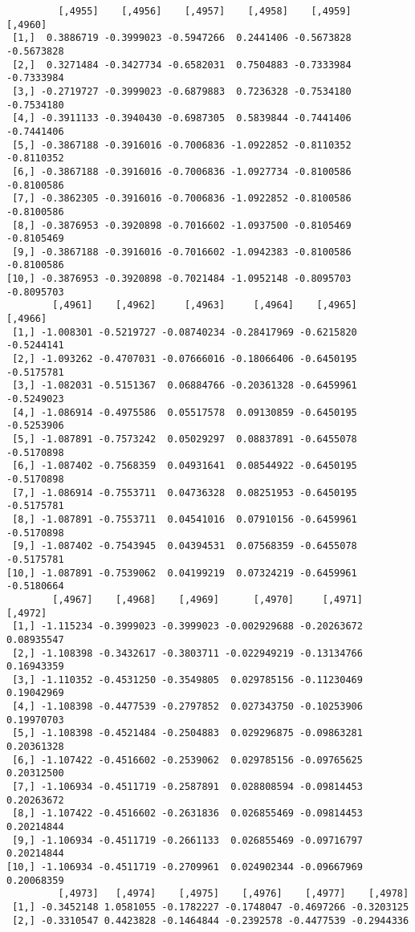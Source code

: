 \documentclass[
  letterpaper,
  DIV=11,
  numbers=noendperiod]{scrreprt}
\begin{document}
\begin{verbatim}
         [,4955]    [,4956]    [,4957]    [,4958]    [,4959]    [,4960]
 [1,]  0.3886719 -0.3999023 -0.5947266  0.2441406 -0.5673828 -0.5673828
 [2,]  0.3271484 -0.3427734 -0.6582031  0.7504883 -0.7333984 -0.7333984
 [3,] -0.2719727 -0.3999023 -0.6879883  0.7236328 -0.7534180 -0.7534180
 [4,] -0.3911133 -0.3940430 -0.6987305  0.5839844 -0.7441406 -0.7441406
 [5,] -0.3867188 -0.3916016 -0.7006836 -1.0922852 -0.8110352 -0.8110352
 [6,] -0.3867188 -0.3916016 -0.7006836 -1.0927734 -0.8100586 -0.8100586
 [7,] -0.3862305 -0.3916016 -0.7006836 -1.0922852 -0.8100586 -0.8100586
 [8,] -0.3876953 -0.3920898 -0.7016602 -1.0937500 -0.8105469 -0.8105469
 [9,] -0.3867188 -0.3916016 -0.7016602 -1.0942383 -0.8100586 -0.8100586
[10,] -0.3876953 -0.3920898 -0.7021484 -1.0952148 -0.8095703 -0.8095703
        [,4961]    [,4962]     [,4963]     [,4964]    [,4965]    [,4966]
 [1,] -1.008301 -0.5219727 -0.08740234 -0.28417969 -0.6215820 -0.5244141
 [2,] -1.093262 -0.4707031 -0.07666016 -0.18066406 -0.6450195 -0.5175781
 [3,] -1.082031 -0.5151367  0.06884766 -0.20361328 -0.6459961 -0.5249023
 [4,] -1.086914 -0.4975586  0.05517578  0.09130859 -0.6450195 -0.5253906
 [5,] -1.087891 -0.7573242  0.05029297  0.08837891 -0.6455078 -0.5170898
 [6,] -1.087402 -0.7568359  0.04931641  0.08544922 -0.6450195 -0.5170898
 [7,] -1.086914 -0.7553711  0.04736328  0.08251953 -0.6450195 -0.5175781
 [8,] -1.087891 -0.7553711  0.04541016  0.07910156 -0.6459961 -0.5170898
 [9,] -1.087402 -0.7543945  0.04394531  0.07568359 -0.6455078 -0.5175781
[10,] -1.087891 -0.7539062  0.04199219  0.07324219 -0.6459961 -0.5180664
        [,4967]    [,4968]    [,4969]      [,4970]     [,4971]    [,4972]
 [1,] -1.115234 -0.3999023 -0.3999023 -0.002929688 -0.20263672 0.08935547
 [2,] -1.108398 -0.3432617 -0.3803711 -0.022949219 -0.13134766 0.16943359
 [3,] -1.110352 -0.4531250 -0.3549805  0.029785156 -0.11230469 0.19042969
 [4,] -1.108398 -0.4477539 -0.2797852  0.027343750 -0.10253906 0.19970703
 [5,] -1.108398 -0.4521484 -0.2504883  0.029296875 -0.09863281 0.20361328
 [6,] -1.107422 -0.4516602 -0.2539062  0.029785156 -0.09765625 0.20312500
 [7,] -1.106934 -0.4511719 -0.2587891  0.028808594 -0.09814453 0.20263672
 [8,] -1.107422 -0.4516602 -0.2631836  0.026855469 -0.09814453 0.20214844
 [9,] -1.106934 -0.4511719 -0.2661133  0.026855469 -0.09716797 0.20214844
[10,] -1.106934 -0.4511719 -0.2709961  0.024902344 -0.09667969 0.20068359
         [,4973]   [,4974]    [,4975]    [,4976]    [,4977]    [,4978]
 [1,] -0.3452148 1.0581055 -0.1782227 -0.1748047 -0.4697266 -0.3203125
 [2,] -0.3310547 0.4423828 -0.1464844 -0.2392578 -0.4477539 -0.2944336

\end{verbatim}
\end{document}
